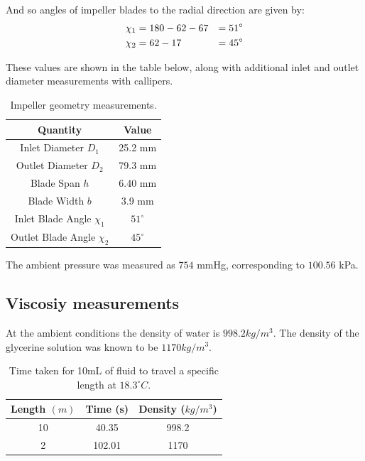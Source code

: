 \documentclass{article}
\begin{document}
And so angles of impeller blades to the radial direction are given by:
\begin{alignat}{2}
    \chi_1 &= 180 - 62 - 67 &= 51^\circ \notag \\
    \chi_2 &= 62 - 17 &= 45^\circ \notag
\end{alignat}

These values are shown in the table below, along with additional inlet and outlet diameter measurements with callipers.

\begin{table}[H]
    \centering
    \begin{tabular}{|c|c|}
        \hline
        \textbf{Quantity} & \textbf{Value} \\
        \hline
        Inlet Diameter $D_1$ & 25.2 mm \\
        Outlet Diameter $D_2$ & 79.3 mm \\
        Blade Span $h$ & 6.40 mm \\
        Blade Width $b$ & 3.9 mm \\
        Inlet Blade Angle $\chi_1$ & $51^\circ$ \\
        Outlet Blade Angle $\chi_2$ & $45^\circ$ \\
        \hline
    \end{tabular}
    \caption{Impeller geometry measurements.}
    \label{tab:impeller_geometry}
\end{table}

The ambient pressure was measured as $754$ mmHg, corresponding to $100.56$ kPa.

\subsection{Viscosiy measurements}

At the ambient conditions the density of water is $998.2 kg/m^3$.
The density of the glycerine solution was known to be $1170 kg/m^3$.

\begin{table}[H]
    \centering
    \begin{tabular}{|c|c|c|}
        \hline
        \textbf{Length} $(m)$ & \textbf{Time} (s) & \textbf{Density} ($kg/m^3$) \\
        \hline
        10 & 40.35 & 998.2 \\
        2 & 102.01 & 1170 \\
        \hline
    \end{tabular}
    \caption{Time taken for 10mL of fluid to travel a specific length at $18.3^\circ C.$}
    \label{tab:viscosity}
\end{table}
\end{document}
